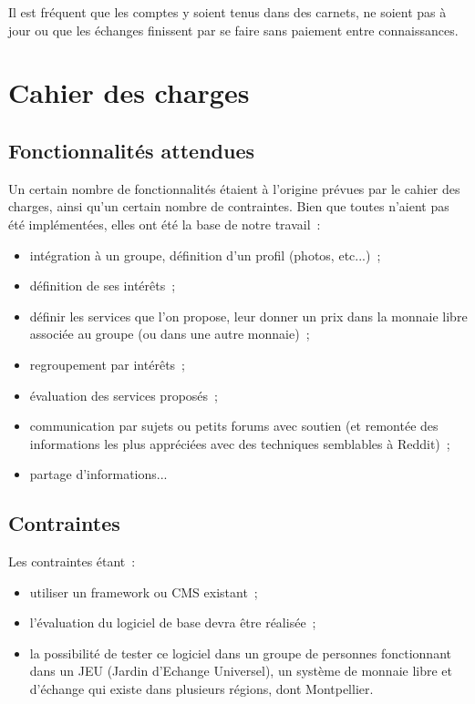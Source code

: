 Il est fréquent que les comptes y soient tenus dans des carnets, ne soient pas à jour ou que les échanges finissent par se faire sans paiement entre connaissances.

\section{Cahier des charges}

\subsection{Fonctionnalités attendues}

Un certain nombre de fonctionnalités étaient à l'origine prévues par le cahier des charges, ainsi qu'un certain nombre de contraintes. Bien que toutes n'aient pas été implémentées, elles ont été la base de notre travail~:
\begin{itemize}
    \item intégration à un groupe, définition d'un profil (photos, etc...)~;
    \item définition de ses intérêts~;
    \item définir les services que l'on propose, leur donner un prix dans la monnaie libre associée au groupe (ou dans une autre monnaie)~;
    \item regroupement par intérêts~;
    \item évaluation des services proposés~;
    \item communication par sujets ou petits forums avec soutien (et remontée des informations les plus appréciées avec des techniques semblables à Reddit)~;
    \item partage d'informations...
\end{itemize}

\subsection{Contraintes}
Les contraintes étant~:
\begin{itemize}
    \item utiliser un framework ou CMS existant~;
    \item l'évaluation du logiciel de base devra être réalisée~;
    \item la possibilité de tester ce logiciel dans un groupe de personnes fonctionnant dans un JEU (Jardin d'Echange Universel), un système de monnaie libre et d'échange qui existe dans plusieurs régions, dont Montpellier.
\end{itemize}

